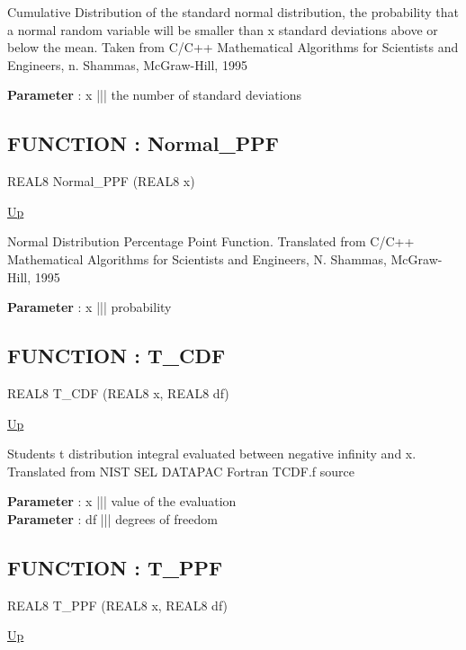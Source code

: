 \par
Cumulative Distribution of the standard normal distribution, the probability that a normal random variable will be smaller than x standard deviations above or below the mean. Taken from C/C++ Mathematical Algorithms for Scientists and Engineers, n. Shammas, McGraw-Hill, 1995
\par
\textbf{Parameter} : x ||| the number of standard deviations \\
\subsection*{FUNCTION : Normal\_PPF}
\hypertarget{ecldoc:logisticregression.distributions.normal_ppf}{}
\begin{minipage}[t]{\textwidth}
\begin{flushleft}
REAL8 Normal\_PPF (REAL8 x)
\end{flushleft}
\end{minipage}
\hyperlink{ecldoc:LogisticRegression.Distributions}{Up}

\par
Normal Distribution Percentage Point Function. Translated from C/C++ Mathematical Algorithms for Scientists and Engineers, N. Shammas, McGraw-Hill, 1995
\par
\textbf{Parameter} : x ||| probability \\
\subsection*{FUNCTION : T\_CDF}
\hypertarget{ecldoc:logisticregression.distributions.t_cdf}{}
\begin{minipage}[t]{\textwidth}
\begin{flushleft}
REAL8 T\_CDF (REAL8 x, REAL8 df)
\end{flushleft}
\end{minipage}
\hyperlink{ecldoc:LogisticRegression.Distributions}{Up}

\par
Students t distribution integral evaluated between negative infinity and x. Translated from NIST SEL DATAPAC Fortran TCDF.f source
\par
\textbf{Parameter} : x ||| value of the evaluation \\
\textbf{Parameter} : df ||| degrees of freedom \\
\subsection*{FUNCTION : T\_PPF}
\hypertarget{ecldoc:logisticregression.distributions.t_ppf}{}
\begin{minipage}[t]{\textwidth}
\begin{flushleft}
REAL8 T\_PPF (REAL8 x, REAL8 df)
\end{flushleft}
\end{minipage}
\hyperlink{ecldoc:LogisticRegression.Distributions}{Up}

